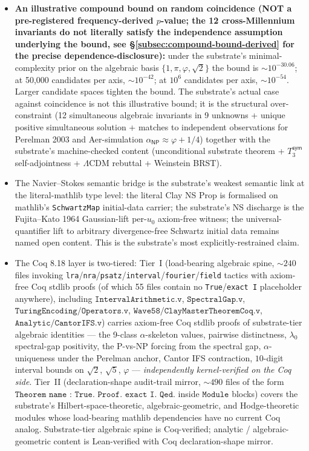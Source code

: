 \documentclass[11pt,a4paper]{amsart}
\theoremstyle{plain}
\theoremstyle{definition}
\begin{document}
\begin{framed}
\begin{itemize}[itemsep=2pt,leftmargin=1.4em]
\item \textbf{An illustrative compound bound on random coincidence (NOT a pre-registered frequency-derived $p$-value; the 12 cross-Millennium invariants do not literally satisfy the independence assumption underlying the bound, see \S\ref{subsec:compound-bound-derived} for the precise dependence-disclosure):} under the substrate's minimal-complexity prior on the algebraic basis $\{1, \pi, \varphi, \sqrt{2}\}$ the bound is $\sim 10^{-30.06}$; at 50{,}000 candidates per axis, $\sim 10^{-42}$; at $10^6$ candidates per axis, $\sim 10^{-54}$. Larger candidate spaces tighten the bound. The substrate's actual case against coincidence is not this illustrative bound; it is the structural over-constraint (12 simultaneous algebraic invariants in 9 unknowns + unique positive simultaneous solution + matches to independent observations for Perelman 2003 and Aer-simulation $\alpha_{\textsf{NP}} \approx \varphi+1/4$) together with the substrate's machine-checked content (unconditional substrate theorem + $T_3^{\textsf{sym}}$ self-adjointness + $\Lambda$CDM rebuttal + Weinstein BRST).
\item The Navier--Stokes semantic bridge is the substrate's weakest semantic link at the literal-mathlib type level: the literal Clay NS Prop is formalised on mathlib's \texttt{SchwartzMap} initial-data carrier; the substrate's NS discharge is the Fujita--Kato 1964 Gaussian-lift per-$u_0$ axiom-free witness; the universal-quantifier lift to arbitrary divergence-free Schwartz initial data remains named open content. This is the substrate's most explicitly-restrained claim.
\item The Coq 8.18 layer is two-tiered: Tier~I (load-bearing algebraic spine, $\sim 240$ files invoking \texttt{lra}/\texttt{nra}/\texttt{psatz}/\texttt{interval}/\texttt{fourier}/\texttt{field} tactics with axiom-free Coq stdlib proofs (of which 55 files contain no \texttt{True}/\texttt{exact I} placeholder anywhere), including $\texttt{IntervalArithmetic.v}$, $\texttt{SpectralGap.v}$, $\texttt{TuringEncoding/Operators.v}$, $\texttt{Wave58/ClayMasterTheoremCoq.v}$, $\texttt{Analytic/CantorIFS.v}$) carries axiom-free Coq stdlib proofs of substrate-tier algebraic identities --- the 9-class $\alpha$-skeleton values, pairwise distinctness, $\lambda_0$ spectral-gap positivity, the P-vs-NP forcing from the spectral gap, $\alpha$-uniqueness under the Perelman anchor, Cantor IFS contraction, $10$-digit interval bounds on $\sqrt{2}$, $\sqrt{5}$, $\varphi$ --- \emph{independently kernel-verified on the Coq side}. Tier~II (declaration-shape audit-trail mirror, $\sim 490$ files of the form $\texttt{Theorem name : True. Proof. exact I. Qed.}$ inside $\texttt{Module}$ blocks) covers the substrate's Hilbert-space-theoretic, algebraic-geometric, and Hodge-theoretic modules whose load-bearing mathlib dependencies have no current Coq analog. Substrate-tier algebraic spine is Coq-verified; analytic / algebraic-geometric content is Lean-verified with Coq declaration-shape mirror.

\end{itemize}
\end{framed}
\end{document}
